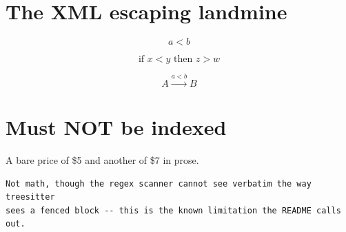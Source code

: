\section{The XML escaping landmine}

\[ a < b \]

\[ \text{if } x < y \text{ then } z > w \]

\[ A \xrightarrow{a<b} B \]

\section{Must NOT be indexed}


A bare price of \$5 and another of \$7 in prose.

\begin{verbatim}
Not math, though the regex scanner cannot see verbatim the way treesitter
sees a fenced block -- this is the known limitation the README calls out.
\end{verbatim}


